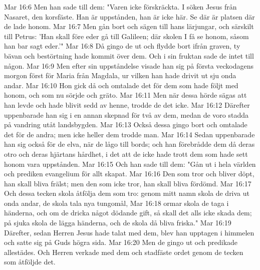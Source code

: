 Mar 16:6  Men han sade till dem: "Varen icke förskräckta. I söken Jesus från Nasaret, den korsfäste. Han är uppstånden, han är icke här. Se där är platsen där de lade honom.
Mar 16:7  Men gån bort och sägen till hans lärjungar, och särskilt till Petrus: 'Han skall före eder gå till Galileen; där skolen I få se honom, såsom han bar sagt eder.'"
Mar 16:8  Då gingo de ut och flydde bort ifrån graven, ty bävan och bestörtning hade kommit över dem. Och i sin fruktan sade de intet till någon.
Mar 16:9  Men efter sin uppståndelse visade han sig på första veckodagens morgon först för Maria från Magdala, ur vilken han hade drivit ut sju onda andar.
Mar 16:10  Hon gick då och omtalade det för dem som hade följt med honom, och som nu sörjde och gräto.
Mar 16:11  Men när dessa hörde sägas att han levde och hade blivit sedd av henne, trodde de det icke.
Mar 16:12  Därefter uppenbarade han sig i en annan skepnad för två av dem, medan de voro stadda på vandring utåt landsbygden.
Mar 16:13  Också dessa gingo bort och omtalade det för de andra; men icke heller dem trodde man.
Mar 16:14  Sedan uppenbarade han sig också för de elva, när de lågo till bords; och han förebrådde dem då deras otro och deras hjärtans hårdhet, i det att de icke hade trott dem som hade sett honom vara uppstånden.
Mar 16:15  Och han sade till dem: "Gån ut i hela världen och prediken evangelium för allt skapat.
Mar 16:16  Den som tror och bliver döpt, han skall bliva frälst; men den som icke tror, han skall bliva fördömd.
Mar 16:17  Och dessa tecken skola åtfölja dem som tro: genom mitt namn skola de driva ut onda andar, de skola tala nya tungomål,
Mar 16:18  ormar skola de taga i händerna, och om de dricka något dödande gift, så skall det alls icke skada dem; på sjuka skola de lägga händerna, och de skola då bliva friska."
Mar 16:19  Därefter, sedan Herren Jesus hade talat med dem, blev han upptagen i himmelen och satte sig på Guds högra sida.
Mar 16:20  Men de gingo ut och predikade allestädes. Och Herren verkade med dem och stadfäste ordet genom de tecken som åtföljde det.


